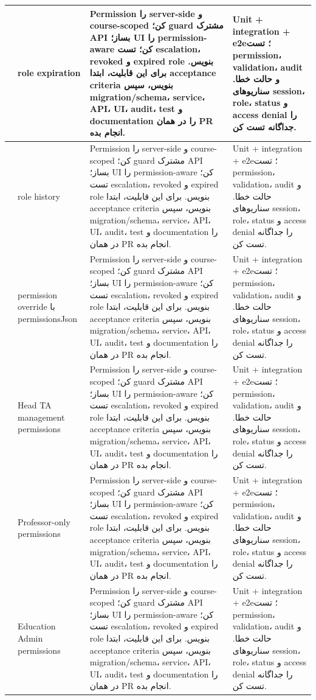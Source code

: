 \documentclass[11pt,a4paper]{article}
\begin{document}
\begin{longtable}{|>{\raggedleft\arraybackslash}p{}|>{\raggedleft\arraybackslash}p{}|>{\raggedleft\arraybackslash}p{}|>{\raggedleft\arraybackslash}p{}|}
40 & role expiration & Permission را server-side و course-scoped کن؛ guard مشترک API بساز؛ UI را permission-aware کن؛ تست escalation، revoked و expired role بنویس. برای این قابلیت، ابتدا acceptance criteria بنویس، سپس migration/schema، service، API، UI، audit، test و documentation را در همان PR انجام بده. & Unit + integration + e2e؛ تست permission، validation، audit و حالت خطا. سناریوهای session، role، status و access denial را جداگانه تست کن. \\ \hline
41 & role history & Permission را server-side و course-scoped کن؛ guard مشترک API بساز؛ UI را permission-aware کن؛ تست escalation، revoked و expired role بنویس. برای این قابلیت، ابتدا acceptance criteria بنویس، سپس migration/schema، service، API، UI، audit، test و documentation را در همان PR انجام بده. & Unit + integration + e2e؛ تست permission، validation، audit و حالت خطا. سناریوهای session، role، status و access denial را جداگانه تست کن. \\ \hline
42 & permission override با permissionsJson & Permission را server-side و course-scoped کن؛ guard مشترک API بساز؛ UI را permission-aware کن؛ تست escalation، revoked و expired role بنویس. برای این قابلیت، ابتدا acceptance criteria بنویس، سپس migration/schema، service، API، UI، audit، test و documentation را در همان PR انجام بده. & Unit + integration + e2e؛ تست permission، validation، audit و حالت خطا. سناریوهای session، role، status و access denial را جداگانه تست کن. \\ \hline
43 & Head TA management permissions & Permission را server-side و course-scoped کن؛ guard مشترک API بساز؛ UI را permission-aware کن؛ تست escalation، revoked و expired role بنویس. برای این قابلیت، ابتدا acceptance criteria بنویس، سپس migration/schema، service، API، UI، audit، test و documentation را در همان PR انجام بده. & Unit + integration + e2e؛ تست permission، validation، audit و حالت خطا. سناریوهای session، role، status و access denial را جداگانه تست کن. \\ \hline
44 & Professor-only permissions & Permission را server-side و course-scoped کن؛ guard مشترک API بساز؛ UI را permission-aware کن؛ تست escalation، revoked و expired role بنویس. برای این قابلیت، ابتدا acceptance criteria بنویس، سپس migration/schema، service، API، UI، audit، test و documentation را در همان PR انجام بده. & Unit + integration + e2e؛ تست permission، validation، audit و حالت خطا. سناریوهای session، role، status و access denial را جداگانه تست کن. \\ \hline
45 & Education Admin permissions & Permission را server-side و course-scoped کن؛ guard مشترک API بساز؛ UI را permission-aware کن؛ تست escalation، revoked و expired role بنویس. برای این قابلیت، ابتدا acceptance criteria بنویس، سپس migration/schema، service، API، UI، audit، test و documentation را در همان PR انجام بده. & Unit + integration + e2e؛ تست permission، validation، audit و حالت خطا. سناریوهای session، role، status و access denial را جداگانه تست کن. \\ \hline

\end{longtable}
\end{document}
